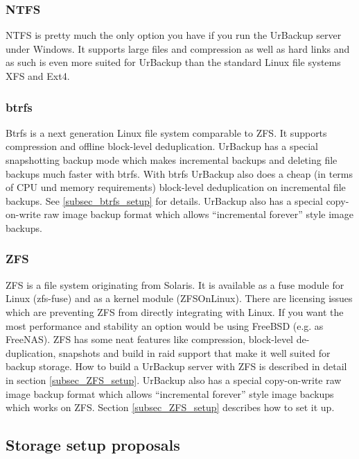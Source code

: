 \documentclass[a4paper,10pt]{article}
\begin{document}
\subsubsection{NTFS}

NTFS is pretty much the only option you have if you run the UrBackup server under Windows. It supports large files and compression as well as hard links and as such is even more suited for UrBackup than the standard Linux file systems XFS and Ext4. 

\subsubsection{btrfs}

Btrfs is a next generation Linux file system comparable to ZFS.
It supports compression and offline block-level deduplication. UrBackup has a special snapshotting backup
mode which makes incremental backups and deleting file backups much faster with btrfs. With btrfs UrBackup also does a cheap (in terms of CPU und memory requirements) block-level deduplication on incremental file backups. See \ref{subsec_btrfs_setup} for details. UrBackup also has a special copy-on-write raw image backup format which allows ``incremental forever'' style image backups.

\subsubsection{ZFS}

ZFS is a file system originating from Solaris.
It is available as a fuse module for Linux (zfs-fuse) and as a kernel module (ZFSOnLinux).
There are licensing issues which are preventing ZFS from directly integrating with Linux.
If you want the most performance and stability an option would be using FreeBSD (e.g. as FreeNAS).
ZFS has some neat features like compression, block-level de-duplication, snapshots and build
in raid support that make it well suited for backup storage.
How to build a UrBackup server with ZFS is described in detail in section \ref{subsec_ZFS_setup}. UrBackup also has a special copy-on-write raw image backup format which allows ``incremental forever'' style image backups which works on ZFS. Section \ref{subsec_ZFS_setup} describes how to set it up.


\subsection{Storage setup proposals}
\label{sec_storage_proposals}
\end{document}
